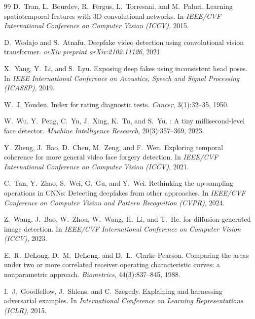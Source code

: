 \documentclass[10pt,twocolumn,letterpaper]{article}
\begin{document}
\begin{thebibliography}{99}
D.~Tran, L.~Bourdev, R.~Fergus, L.~Torresani, and M.~Paluri.
\newblock Learning spatiotemporal features with 3{D} convolutional networks.
\newblock In \emph{IEEE/CVF International Conference on Computer Vision (ICCV)}, 2015.

D.~Wodajo and S.~Atnafu.
\newblock Deepfake video detection using convolutional vision transformer.
\newblock \emph{arXiv preprint arXiv:2102.11126}, 2021.

X.~Yang, Y.~Li, and S.~Lyu.
\newblock Exposing deep fakes using inconsistent head poses.
\newblock In \emph{IEEE International Conference on Acoustics, Speech and Signal Processing (ICASSP)}, 2019.

W.~J. Youden.
\newblock Index for rating diagnostic tests.
\newblock \emph{Cancer}, 3(1):32--35, 1950.

W.~Wu, Y.~Peng, C.~Yu, J.~Xing, K.~Tu, and S.~Yu.
: A tiny millisecond-level face detector.
\newblock \emph{Machine Intelligence Research}, 20(3):357--369, 2023.

Y.~Zheng, J.~Bao, D.~Chen, M.~Zeng, and F.~Wen.
\newblock Exploring temporal coherence for more general video face forgery detection.
\newblock In \emph{IEEE/CVF International Conference on Computer Vision (ICCV)}, 2021.

C.~Tan, Y.~Zhao, S.~Wei, G.~Gu, and Y.~Wei.
\newblock Rethinking the up-sampling operations in {CNN}s: Detecting deepfakes from other approaches.
\newblock In \emph{IEEE/CVF Conference on Computer Vision and Pattern Recognition (CVPR)}, 2024.

Z.~Wang, J.~Bao, W.~Zhou, W.~Wang, H.~Li, and T.~He.
 for diffusion-generated image detection.
\newblock In \emph{IEEE/CVF International Conference on Computer Vision (ICCV)}, 2023.

E.~R.~DeLong, D.~M.~DeLong, and D.~L.~Clarke-Pearson.
\newblock Comparing the areas under two or more correlated receiver operating characteristic curves: a nonparametric approach.
\newblock \emph{Biometrics}, 44(3):837--845, 1988.

I.~J.~Goodfellow, J.~Shlens, and C.~Szegedy.
\newblock Explaining and harnessing adversarial examples.
\newblock In \emph{International Conference on Learning Representations (ICLR)}, 2015.

\end{thebibliography}
\end{document}
